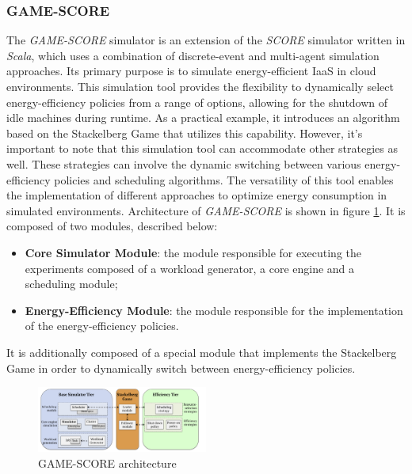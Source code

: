 {\subsubsection*{GAME-SCORE}
The \emph{GAME-SCORE} simulator \cite{fernandez2019game} is an extension of the \emph{SCORE} simulator written in \emph{Scala}, which uses a combination of discrete-event and multi-agent simulation approaches. Its primary purpose is to simulate energy-efficient IaaS in cloud environments. This simulation tool provides the flexibility to dynamically select energy-efficiency policies from a range of options, allowing for the shutdown of idle machines during runtime. As a practical example, it introduces an algorithm based on the Stackelberg Game that utilizes this capability. However, it's important to note that this simulation tool can accommodate other strategies as well. These strategies can involve the dynamic switching between various energy-efficiency policies and scheduling algorithms. The versatility of this tool enables the implementation of different approaches to optimize energy consumption in simulated environments.
Architecture of \emph{GAME-SCORE} is shown in figure \ref{fig:gamescore_arch}. It is composed of two modules, described below:
\begin{itemize}
    \item \textbf{Core Simulator Module}: the module responsible for executing the experiments composed of a workload generator, a core engine and a scheduling module;
    \item \textbf{Energy-Efficiency Module}: the module responsible for the implementation of the energy-efficiency policies.
\end{itemize}
It is additionally composed of a special module that implements the Stackelberg Game in order to dynamically switch between energy-efficiency policies. 
\begin{figure}[h]
    \centering
    \includegraphics[width=0.5\textwidth]{chapters/images/gamescore_arch.png}
    \caption{GAME-SCORE architecture}
    \label{fig:gamescore_arch}
\end{figure}
}
